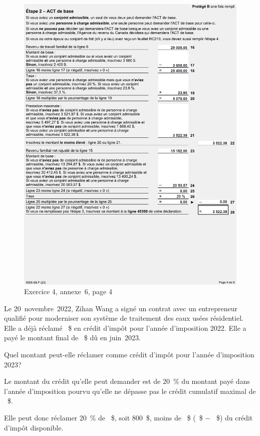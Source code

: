 \begin{figure}
	\centering
	\includegraphics[width=.9\textwidth]{exercice/7-4/Q4/Annexe6p4.png}
	\caption[]{Exercice 4, annexe~6, page 4}
	\label{fig:chap7Exercice4Annexe6p4}
\end{figure}

\begin{question}
	Le 20~novembre~2022, Zihan Wang a signé un contrat avec un entrepreneur qualifié pour moderniser son système de traitement des eaux usées résidentiel. Elle a déjà réclamé ~\$ en crédit d'impôt pour l'année d'imposition 2022. Elle a payé le montant final de ~\$ dû en juin~2023.
	
	Quel montant peut-elle réclamer comme crédit d'impôt pour l'année d'imposition 2023?
\end{question}
Le montant du crédit qu'elle peut demander est de 20~\% du montant payé dans l'année d'imposition pourvu qu'elle ne dépasse pas le crédit cumulatif maximal de ~\$.

Elle peut donc réclamer 20~\% de ~\$, soit 800~\$, moins de ~\$ (~\$ $-$ ~\$) du crédit d'impôt disponible.



